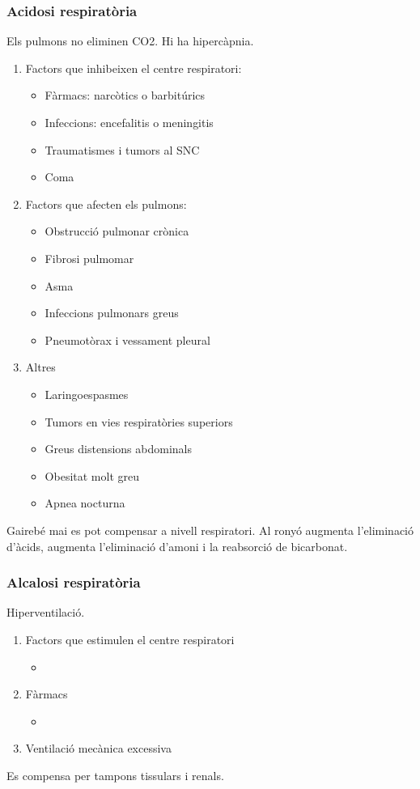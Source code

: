 \subsubsection{Acidosi respiratòria}
\label{sec:acidosi-respiratoria}

Els pulmons no eliminen CO2. Hi ha hipercàpnia.

\begin{enumerate}
\item Factors que inhibeixen el centre respiratori:
  \begin{itemize}
  \item Fàrmacs: narcòtics o barbitúrics
  \item Infeccions: encefalitis o meningitis
  \item Traumatismes i tumors al SNC
  \item Coma
  \end{itemize}
\item Factors que afecten els pulmons:
  \begin{itemize}
  \item Obstrucció pulmonar crònica
  \item Fibrosi pulmomar
  \item Asma
  \item Infeccions pulmonars greus
  \item Pneumotòrax i vessament pleural
  \end{itemize}
\item Altres
  \begin{itemize}
  \item Laringoespasmes
  \item Tumors en vies respiratòries superiors
  \item Greus distensions abdominals
  \item Obesitat molt greu
  \item Apnea nocturna
  \end{itemize}
\end{enumerate}

Gairebé mai es pot compensar a nivell respiratori. Al ronyó augmenta
l'eliminació d'àcids, augmenta l'eliminació d'amoni i la reabsorció de
bicarbonat.

\subsubsection{Alcalosi respiratòria}
\label{sec:alcal-resp}

Hiperventilació.

\begin{enumerate}
\item Factors que estimulen el centre respiratori
  \begin{itemize}
  \item 
  \end{itemize}
\item Fàrmacs
  \begin{itemize}
  \item 
  \end{itemize}
\item Ventilació mecànica excessiva
\end{enumerate}

Es compensa per tampons tissulars i renals. 

